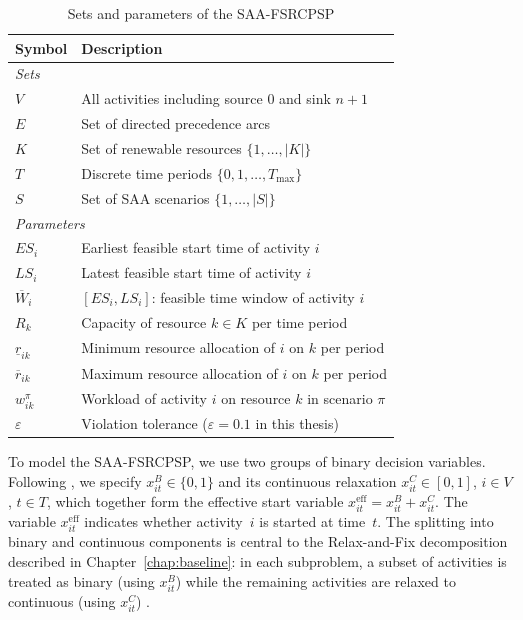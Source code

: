 \begin{table}[htbp]
\centering
\caption{Sets and parameters of the SAA-FSRCPSP}
\label{tab:sets_params}
\renewcommand{\arraystretch}{1.1}
\begin{tabular}{lp{9cm}}
\hline
\textbf{Symbol} & \textbf{Description} \\
\hline
\multicolumn{2}{l}{\textit{Sets}} \\[2pt]
$V$       & All activities including source $0$ and sink $n+1$ \\[4pt]
$E$       & Set of directed precedence arcs \\[4pt]
$K$       & Set of renewable resources $\{1,\ldots,|K|\}$ \\[4pt]
$T$       & Discrete time periods $\{0,1,\ldots,T_{\max}\}$ \\[4pt]
$S$       & Set of SAA scenarios $\{1,\ldots,|S|\}$ \\[6pt]
\hline
\multicolumn{2}{l}{\textit{Parameters}} \\[2pt]
$ES_i$    & Earliest feasible start time of activity $i$ \\[4pt]
$LS_i$    & Latest feasible start time of activity $i$ \\[4pt]
$\overline{W}_i$
          & $[ES_i, LS_i]$: feasible time window of activity $i$ \\[4pt]
$R_k$     & Capacity of resource $k \in K$ per time period \\[4pt]
$\underline{r}_{ik}$
          & Minimum resource allocation of $i$ on $k$ per period \\[4pt]
$\overline{r}_{ik}$
          & Maximum resource allocation of $i$ on $k$ per period \\[4pt]
$w_{ik}^{\pi}$
          & Workload of activity $i$ on resource $k$ in scenario $\pi$ \\[4pt]
$\varepsilon$
          & Violation tolerance ($\varepsilon = 0.1$ in this thesis) \\
\hline
\end{tabular}
\end{table}

To model the SAA-FSRCPSP, we use two groups of binary
decision variables. Following \textcite{Pritsker1969}, we specify
$x^B_{it} \in \{0, 1\}$ and its continuous relaxation
$x^C_{it} \in [0, 1]$, $i \in V$, $t \in T$, which together form
the effective start variable
$x^{\mathrm{eff}}_{it} = x^B_{it} + x^C_{it}$. The variable
$x^{\mathrm{eff}}_{it}$ indicates whether activity~$i$ is started
at time~$t$. The splitting into binary and continuous components
is central to the Relax-and-Fix decomposition described in
Chapter~\ref{chap:baseline}: in each subproblem, a subset of
activities is treated as binary (using $x^B_{it}$) while the
remaining activities are relaxed to continuous (using $x^C_{it}$)
\parencite{pochet2006, Helber2010}.

